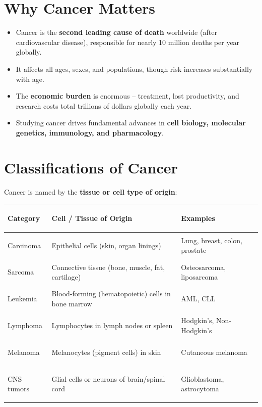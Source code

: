 \documentclass[11pt, letterpaper]{article}
\begin{document}
\section*{Why Cancer Matters}

\begin{itemize}[noitemsep]
  \item Cancer is the \textbf{second leading cause of death} worldwide (after cardiovascular disease), responsible for nearly 10 million deaths per year globally.
  \item It affects all ages, sexes, and populations, though risk increases substantially with age.
  \item The \textbf{economic burden} is enormous -- treatment, lost productivity, and research costs total trillions of dollars globally each year.
  \item Studying cancer drives fundamental advances in \textbf{cell biology, molecular genetics, immunology, and pharmacology}.
\end{itemize}

\section*{Classifications of Cancer}

Cancer is named by the \textbf{tissue or cell type of origin}:

\noindent
{\renewcommand{\arraystretch}{1.5}
\begin{tabularx}{\textwidth}{>{\bfseries\raggedright\arraybackslash}p{3.2cm}>{\raggedright\arraybackslash}X>{\raggedright\arraybackslash}p{4.2cm}}
\toprule
\rowcolor{tableheader}
\textbf{Category} & \textbf{Cell / Tissue of Origin} & \textbf{Examples} \\
\midrule
\rowcolor{rowA} Carcinoma      & Epithelial cells (skin, organ linings) & Lung, breast, colon, prostate \\
\rowcolor{rowB} Sarcoma        & Connective tissue (bone, muscle, fat, cartilage) & Osteosarcoma, liposarcoma \\
\rowcolor{rowA} Leukemia       & Blood-forming (hematopoietic) cells in bone marrow & AML, CLL \\
\rowcolor{rowB} Lymphoma       & Lymphocytes in lymph nodes or spleen & Hodgkin's, Non-Hodgkin's \\
\rowcolor{rowA} Melanoma       & Melanocytes (pigment cells) in skin & Cutaneous melanoma \\
\rowcolor{rowB} CNS tumors     & Glial cells or neurons of brain/spinal cord & Glioblastoma, astrocytoma \\
\bottomrule
\end{tabularx}}
\end{document}
